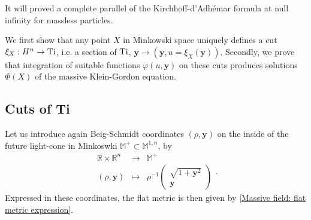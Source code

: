 \documentclass[a4paper, 10pt]{article}
\theoremstyle{remark}
\newcommand{\Ti}{\textnormal{Ti}}
\newcommand{\y}{\bm{y}}
\begin{document}
It will proved a complete parallel of the Kirchhoff-d'Adhémar formula at null infinity \cite{Kirchhoff:1883aa,Penrose_1980,penrose_spinors_1984} for massless particles.

We first show that any point $X$ in Minkowski space uniquely defines a cut $\xi_X : H^n \to \Ti$, i.e. a section of $\Ti$, $\y \to (\y , u = \xi_X(\y))$. Secondly, we prove that integration of suitable functions $\varphi(u,\y)$ on these cuts produces solutions $\Phi(X)$ of the massive Klein-Gordon equation.

\subsection{Cuts of Ti}

Let us introduce again Beig-Schmidt coordinates  $(\rho, \bm{y})$ on the inside of the future light-cone in Minkoswki $\mathbb{M}^{+} \subset \mathbb{M}^{1,n}$, by 
\begin{equation}\label{cuts: beig-schmidt chart}
    \begin{array}{ccc}
        \mathbb{R} \times \mathbb{R}^n  & \to & \mathbb{M}^{+}  \\[0.2em]
         (\rho, \bm{y}) & \mapsto  & \rho^{-1} \begin{pmatrix}
        \sqrt{1 + \bm{y}^2}\\ \bm{y}
    \end{pmatrix}
    \end{array}.
\end{equation}
Expressed in these coordinates, the flat metric is then given by \eqref{Massive field: flat metric expression}.
\end{document}

